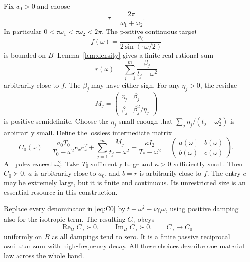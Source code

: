 \documentclass[11pt]{article}
\newcommand{\ReH}{\operatorname{Re}_{H}}
\newcommand{\ImH}{\operatorname{Im}_{H}}
\newcommand{\ex}{e_x}
\begin{document}
Fix $a_0>0$ and choose
\begin{equation}\label{eq:tau}
 \tau=\frac{2\pi}{\omega_1+\omega_2}.
\end{equation}
In particular $0<\tau\omega_1<\tau\omega_2<2\pi$. The positive continuous target
\[
 f(\omega)=\frac{a_0}{2\sin(\tau\omega/2)}
\]
is bounded on $B$. Lemma~\ref{lem:density} gives a finite real rational sum
\[
 r(\omega)=\sum_{j=1}^m\frac{\beta_j}{t_j-\omega^2}
\]
arbitrarily close to $f$. The $\beta_j$ may have either sign. For any
$\eta_j>0$, the residue
\[
 M_j=
 \begin{pmatrix}\eta_j&\beta_j\\
                 \beta_j&\beta_j^2/\eta_j\end{pmatrix}
\]
is positive semidefinite. Choose the $\eta_j$ small enough that
$\sum_j\eta_j/(t_j-\omega_2^2)$ is arbitrarily small. Define the lossless
intermediate matrix
\begin{equation}\label{eq:C0}
 C_0(\omega)=
 \frac{a_0T_0}{T_0-\omega^2}\ex\ex^T+
 \sum_{j=1}^m\frac{M_j}{t_j-\omega^2}+
 \frac{\kappa I_2}{T_*-\omega^2}
 =
 \begin{pmatrix}a(\omega)&b(\omega)\\ b(\omega)&c(\omega)\end{pmatrix}.
\end{equation}
All poles exceed $\omega_2^2$. Take $T_0$ sufficiently large and $\kappa>0$
sufficiently small. Then $C_0\succ0$, $a$ is arbitrarily close to $a_0$, and
$b=r$ is arbitrarily close to $f$. The entry $c$ may be extremely large, but
it is finite and continuous. Its unrestricted size is an essential resource
in this construction.

Replace every denominator in \eqref{eq:C0} by
$t-\omega^2-i\gamma_t\omega$, using positive damping also for the isotropic
term. The resulting $C_\gamma$ obeys
\[
 \ReH C_\gamma\succ0,\qquad \ImH C_\gamma\succ0,\qquad
 C_\gamma\longrightarrow C_0
\]
uniformly on $B$ as all dampings tend to zero. It is a finite passive reciprocal
oscillator sum with high-frequency decay. All these choices describe one
material law across the whole band.
\end{document}
